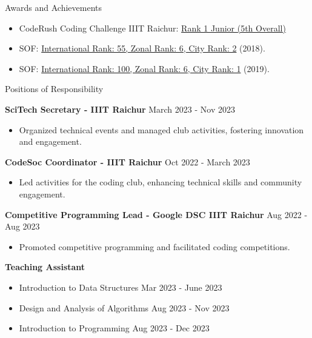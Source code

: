 \documentclass{resume}
\begin{document}
\begin{rSection}{Awards and Achievements}

    \begin{itemize}
        \itemsep -3pt {}
        \item CodeRush Coding Challenge IIIT Raichur: \href{https://drive.google.com/file/d/1BdOPAlKCXyNEZf-ujJ5Iu8lBBra77hJg/view?usp=sharing}{Rank 1 Junior (5th Overall)}
        \item SOF: \href{https://drive.google.com/file/d/1b_JE3MbNI2eW9xpYvC1NWCfUGChuEVBy/view?usp=sharing}{International Rank: 55, Zonal Rank: 6, City Rank: 2} (2018).
        \item SOF: \href{https://drive.google.com/file/d/1bnRRCB6FZKDpJm0-Ogz15o56iG2QN_1t/view?usp=sharing}{International Rank: 100, Zonal Rank: 6, City Rank: 1} (2019).
    \end{itemize}

\end{rSection}


\begin{rSection}{Positions of Responsibility}

    \textbf{SciTech Secretary - IIIT Raichur} \hfill March 2023 - Nov 2023
    \begin{itemize}
        \itemsep -3pt {}
        \item Organized technical events and managed club activities, fostering innovation and engagement.
    \end{itemize}

    \textbf{CodeSoc Coordinator - IIIT Raichur} \hfill Oct 2022 - March 2023
    \begin{itemize}
        \itemsep -3pt {}
        \item Led activities for the coding club, enhancing technical skills and community engagement.
    \end{itemize}

    \textbf{Competitive Programming Lead - Google DSC IIIT Raichur} \hfill Aug 2022 - Aug 2023
    \begin{itemize}
        \itemsep -3pt {}
        \item Promoted competitive programming and facilitated coding competitions.
    \end{itemize}

    \textbf{Teaching Assistant}
    \begin{itemize}
        \itemsep -3pt {}
        \item Introduction to Data Structures \hfill Mar 2023 - June 2023
        \item Design and Analysis of Algorithms \hfill Aug 2023 - Nov 2023
        \item Introduction to Programming \hfill Aug 2023 - Dec 2023
    \end{itemize}

\end{rSection}
\end{document}
